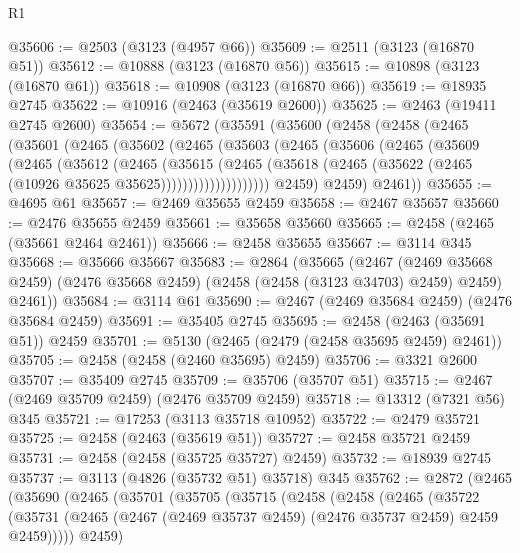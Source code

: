 \begin{lexlean}{R1}
\begin{coremodule}
@35606 := @2503 (@3123 (@4957 @66))
@35609 := @2511 (@3123 (@16870 @51))
@35612 := @10888 (@3123 (@16870 @56))
@35615 := @10898 (@3123 (@16870 @61))
@35618 := @10908 (@3123 (@16870 @66))
@35619 := @18935 @2745
@35622 := @10916 (@2463 (@35619 @2600))
@35625 := @2463 (@19411 @2745 @2600)
@35654 := @5672
    (@35591
      (@35600
        (@2458
          (@2458
            (@2465
              (@35601
                (@2465
                  (@35602
                    (@2465
                      (@35603
                        (@2465
                          (@35606
                            (@2465
                              (@35609
                                (@2465
                                  (@35612
                                    (@2465
                                      (@35615
                                        (@2465
                                          (@35618
                                            (@2465
                                              (@35622
                                                (@2465 (@10926 @35625 @35625))))))))))))))))))))
            @2459)
          @2459)
        @2461))
@35655 := @4695 @61
@35657 := @2469 @35655 @2459
@35658 := @2467 @35657
@35660 := @2476 @35655 @2459
@35661 := @35658 @35660
@35665 := @2458 (@2465 (@35661 @2464 @2461))
@35666 := @2458 @35655
@35667 := @3114 @345
@35668 := @35666 @35667
@35683 := @2864
    (@35665
      (@2467
        (@2469 @35668 @2459)
        (@2476 @35668 @2459)
        (@2458 (@2458 (@3123 @34703) @2459) @2459)
        @2461))
@35684 := @3114 @61
@35690 := @2467 (@2469 @35684 @2459) (@2476 @35684 @2459)
@35691 := @35405 @2745
@35695 := @2458 (@2463 (@35691 @51)) @2459
@35701 := @5130 (@2465 (@2479 (@2458 @35695 @2459) @2461))
@35705 := @2458 (@2458 (@2460 @35695) @2459)
@35706 := @3321 @2600
@35707 := @35409 @2745
@35709 := @35706 (@35707 @51)
@35715 := @2467 (@2469 @35709 @2459) (@2476 @35709 @2459)
@35718 := @13312 (@7321 @56) @345
@35721 := @17253 (@3113 @35718 @10952)
@35722 := @2479 @35721
@35725 := @2458 (@2463 (@35619 @51))
@35727 := @2458 @35721 @2459
@35731 := @2458 (@2458 (@35725 @35727) @2459)
@35732 := @18939 @2745
@35737 := @3113 (@4826 (@35732 @51) @35718) @345
@35762 := @2872
    (@2465
      (@35690
        (@2465
          (@35701
            (@35705
              (@35715
                (@2458
                  (@2458
                    (@2465
                      (@35722
                        (@35731
                          (@2465 (@2467 (@2469 @35737 @2459) (@2476 @35737 @2459) @2459 @2459)))))
                    @2459)

\end{coremodule}
\end{lexlean}
